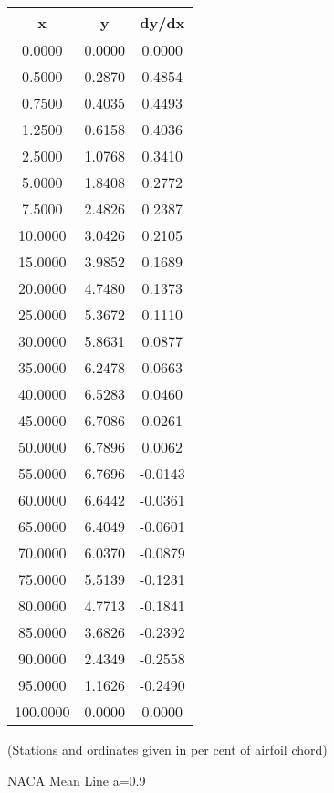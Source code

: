 \documentclass[11pt]{book}
\begin{document}
 \vspace{8mm}
 \begin{tabular}{|c|c|c|}  \hline
 x & y & dy/dx \\
 \hline
0.0000 & 0.0000 & 0.0000 \\
0.5000 & 0.2870 & 0.4854 \\
0.7500 & 0.4035 & 0.4493 \\
1.2500 & 0.6158 & 0.4036 \\
2.5000 & 1.0768 & 0.3410 \\
5.0000 & 1.8408 & 0.2772 \\
7.5000 & 2.4826 & 0.2387 \\
10.0000 & 3.0426 & 0.2105 \\
15.0000 & 3.9852 & 0.1689 \\
20.0000 & 4.7480 & 0.1373 \\
25.0000 & 5.3672 & 0.1110 \\
30.0000 & 5.8631 & 0.0877 \\
35.0000 & 6.2478 & 0.0663 \\
40.0000 & 6.5283 & 0.0460 \\
45.0000 & 6.7086 & 0.0261 \\
50.0000 & 6.7896 & 0.0062 \\
55.0000 & 6.7696 & -0.0143 \\
60.0000 & 6.6442 & -0.0361 \\
65.0000 & 6.4049 & -0.0601 \\
70.0000 & 6.0370 & -0.0879 \\
75.0000 & 5.5139 & -0.1231 \\
80.0000 & 4.7713 & -0.1841 \\
85.0000 & 3.6826 & -0.2392 \\
90.0000 & 2.4349 & -0.2558 \\
95.0000 & 1.1626 & -0.2490 \\
100.0000 & 0.0000 & 0.0000 \\
 \hline
 \end{tabular}
 \vspace{8mm}

(Stations and ordinates given in per cent of airfoil chord)

 \newpage
 \label{mla=0.9}
 \begin{Large}
 NACA Mean Line a=0.9
 \end{Large}
  
\end{document}
